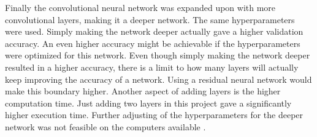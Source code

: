 Finally the convolutional neural network was expanded upon with more convolutional layers, making it a deeper network. The same hyperparameters were used. Simply making the network deeper actually gave a higher validation accuracy. An even higher accuracy might be achievable if the hyperparameters were optimized for this network. Even though simply making the network deeper resulted in a higher accuracy, there is a limit to how many layers will actually keep improving the accuracy of a network. Using a residual neural network would make this boundary higher. Another aspect of adding layers is the higher computation time. Just adding two layers in this project gave a significantly higher execution time. Further adjusting of the hyperparameters for the deeper network was not feasible on the computers available \citep{resnet}. 